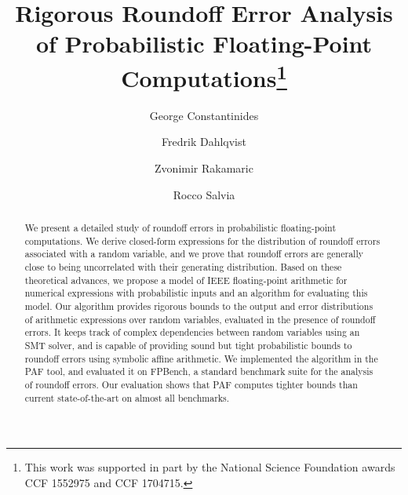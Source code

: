 \documentclass[runningheads]{llncs}
\begin{document}
\title{Rigorous Roundoff Error Analysis of Probabilistic Floating-Point
Computations\thanks{This work was supported in part by the National Science
Foundation awards CCF 1552975 and CCF 1704715.}}


\author{George Constantinides \and
Fredrik Dahlqvist \and
Zvonimir Rakamaric\and Rocco Salvia}



\maketitle              %

\begin{abstract}
We present a detailed study of roundoff errors in probabilistic floating-point computations.
We derive closed-form expressions for the distribution of roundoff errors associated with a random variable, and we prove that roundoff errors are generally close to being uncorrelated with their generating distribution. Based on these theoretical advances, we propose a model of IEEE floating-point arithmetic for numerical expressions with probabilistic inputs and an algorithm for evaluating this model.  Our algorithm provides rigorous bounds to the output and error distributions of arithmetic expressions over random variables, evaluated in the presence of roundoff errors.  It keeps track of complex dependencies between random variables using an SMT solver,  and is capable of providing sound but tight probabilistic bounds to roundoff errors using symbolic affine arithmetic.  We implemented the algorithm in the PAF tool, and evaluated it on FPBench, a standard benchmark suite for the analysis of roundoff errors. Our evaluation shows that PAF computes tighter bounds than current state-of-the-art on almost all benchmarks.
\end{abstract}












\newpage




\newpage


\end{document}
